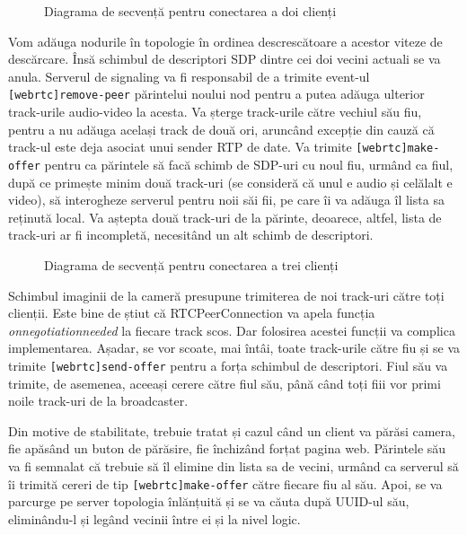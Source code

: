 \begin{figure}[H]
    \centering
    \scalebox{0.7}{}
    \caption{Diagrama de secvență pentru conectarea a doi clienți}
\end{figure}
\indent \par Vom adăuga nodurile în topologie în ordinea descrescătoare a acestor viteze de descărcare. Însă schimbul de descriptori SDP dintre cei doi vecini actuali se va anula. Serverul de signaling va fi responsabil de a trimite event-ul \texttt{[webrtc]remove-peer} părintelui noului nod pentru a putea adăuga ulterior track-urile audio-video la acesta. Va șterge track-urile către vechiul său fiu, pentru a nu adăuga același track de două ori, aruncând excepție din cauză că track-ul este deja asociat unui sender RTP de date. Va trimite \texttt{[webrtc]make-offer} pentru ca părintele să facă schimb de SDP-uri cu noul fiu, urmând ca fiul, după ce primește minim două track-uri (se consideră că unul e audio și celălalt e video), să interogheze serverul pentru noii săi fii, pe care îi va adăuga îl lista sa reținută local. Va aștepta două track-uri de la părinte, deoarece, altfel, lista de track-uri ar fi incompletă, necesitând un alt schimb de descriptori.
\begin{figure}[H]
    \centering
    \scalebox{0.7}{}
    \caption{Diagrama de secvență pentru conectarea a trei clienți}
\end{figure}
\indent \par Schimbul imaginii de la cameră presupune trimiterea de noi track-uri către toți clienții. Este bine de știut că RTCPeerConnection va apela funcția \textit{onnegotiationneeded} la fiecare track scos. Dar folosirea acestei funcții va complica implementarea. Așadar, se vor scoate, mai întâi, toate track-urile către fiu și se va trimite \texttt{[webrtc]send-offer} pentru a forța schimbul de descriptori. Fiul său va trimite, de asemenea, aceeași cerere către fiul său, până când toți fiii vor primi noile track-uri de la broadcaster.
\indent \par Din motive de stabilitate, trebuie tratat și cazul când un client va părăsi camera, fie apăsând un buton de părăsire, fie închizând forțat pagina web. Părintele său va fi semnalat că trebuie să îl elimine din lista sa de vecini, urmând ca serverul să îi trimită cereri de tip \texttt{[webrtc]make-offer} către fiecare fiu al său. Apoi, se va parcurge pe server topologia înlănțuită și se va căuta după UUID-ul său, eliminându-l și legând vecinii între ei și la nivel logic.
